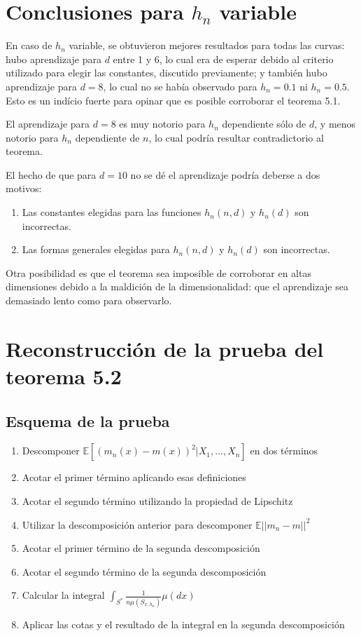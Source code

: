 \documentclass[12pt, a4paper]{article}
\begin{document}
\section{Conclusiones para $h_n$ variable}

En caso de $h_n$ variable, se obtuvieron mejores resultados para todas las curvas: hubo aprendizaje para $d$ entre 1 y 6, lo cual era de esperar debido al criterio utilizado para elegir las constantes, discutido previamente; y también hubo aprendizaje para $d=8$, lo cual no se había observado para $h_n=0.1$ ni $h_n=0.5$. Esto es un indício fuerte para opinar que es posible corroborar el teorema 5.1.

El aprendizaje para $d=8$ es muy notorio para $h_n$ dependiente sólo de $d$, y menos notorio para $h_n$ dependiente de $n$, lo cual podría resultar contradictorio al teorema.

El hecho de que para $d=10$ no se dé el aprendizaje podría deberse a dos motivos:
\begin{enumerate}
  \item Las constantes elegidas para las funciones $h_n(n,d)$ y $h_n(d)$ son incorrectas.
  \item Las formas generales elegidas para $h_n(n,d)$ y $h_n(d)$ son incorrectas.
\end{enumerate}

Otra posibilidad es que el teorema sea imposible de corroborar en altas dimensiones debido a la maldición de la dimensionalidad: que el aprendizaje sea demasiado lento como para observarlo.


\newpage
\section{Reconstrucción de la prueba del teorema 5.2}
\subsection{Esquema de la prueba}

\begin{enumerate}
  \item Descomponer $ \mathds{E}[ (m_n(x) - m(x))^2 | X_1, ..., X_n] $ en dos términos
  \item Acotar el primer término aplicando esas definiciones
  \item Acotar el segundo término utilizando la propiedad de Lipschitz
  \item Utilizar la descomposición anterior para descomponer $\mathds{E}|| m_n -m ||^2$
  \item Acotar el primer término de la segunda descomposición
  \item Acotar el segundo término de la segunda descomposición
  \item Calcular la integral $\int_{S^{*}} \frac{1}{n\mu(S_{x,h_n})} \mu(dx) $
  \item Aplicar las cotas y el resultado de la integral en la segunda descomposición 
\end{enumerate}
\end{document}
